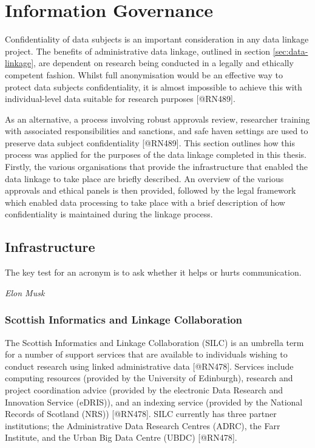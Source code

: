 \documentclass[]{article}
\begin{document}
\section{Information Governance}\label{sec:ig}

Confidentiality of data subjects is an important consideration in any
data linkage project. The benefits of administrative data linkage,
outlined in section \ref{sec:data-linkage}, are dependent on research
being conducted in a legally and ethically competent fashion. Whilst
full anonymisation would be an effective way to protect data subjects
confidentiality, it is almost impossible to achieve this with
individual-level data suitable for research purposes {[}@RN489{]}.

As an alternative, a process involving robust approvals review,
researcher training with associated responsibilities and sanctions, and
safe haven settings are used to preserve data subject confidentiality
{[}@RN489{]}. This section outlines how this process was applied for the
purposes of the data linkage completed in this thesis. Firstly, the
various organisations that provide the infrastructure that enabled the
data linkage to take place are briefly described. An overview of the
various approvals and ethical panels is then provided, followed by the
legal framework which enabled data processing to take place with a brief
description of how confidentiality is maintained during the linkage
process.

\subsection{Infrastructure}\label{subsec:infrastructure}

\epigraph{The key test for an acronym is to ask whether it helps or hurts communication.}{\textit{Elon Musk}}

\subsubsection{Scottish Informatics and Linkage Collaboration}\label{subsec:silc}

The Scottish Informatics and Linkage Collaboration (SILC) is an umbrella
term for a number of support services that are available to individuals
wishing to conduct research using linked administrative data
{[}@RN478{]}. Services include computing resources (provided by the
University of Edinburgh), research and project coordination advice
(provided by the electronic Data Research and Innovation Service
(eDRIS)), and an indexing service (provided by the National Records of
Scotland (NRS)) {[}@RN478{]}. SILC currently has three partner
institutions; the Administrative Data Research Centres (ADRC), the Farr
Institute, and the Urban Big Data Centre (UBDC) {[}@RN478{]}.
\end{document}
